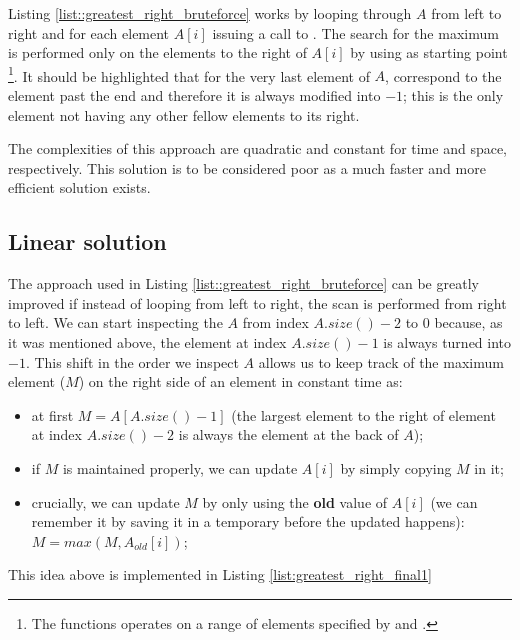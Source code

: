 

Listing \ref{list::greatest_right_bruteforce} works by looping through $A$ from left to right and for each element $A[i]$ issuing a call to . The search for the maximum is performed only on the elements to the right of $A[i]$ by using as starting point \footnote{The  functions operates on a range of elements specified by  and  \cite{cit::std::maxelement}.}.
It should be highlighted that for the very last element of $A$,  correspond to the element past the end and therefore it is always modified into $-1$; this is the only element not having any other fellow elements to its right.

The complexities of this approach are quadratic and constant for time and space, respectively. 
This solution is to be considered poor as a much faster and more efficient solution exists.

\subsection{Linear solution}
\label{sec:greatest_right:linear}
The approach used in Listing \ref{list::greatest_right_bruteforce} can be greatly improved if instead of looping from left to right, the scan is performed from right to left.
We can start inspecting the $A$ from index $A.size()-2$ to $0$ because, as it was mentioned above, the  element at index $A.size()-1$ is always turned into $-1$. 
This shift in the order we inspect $A$ allows us to keep track of the maximum element ($M$) on the right side of an element in constant time as:
\begin{itemize}
	\item at first $M=A[A.size()-1]$ (the largest element to the right of element at index $A.size()-2$ is always the element at the back of $A$);
	\item if $M$ is maintained properly, we can update $A[i]$ by simply copying $M$ in it;
	\item crucially, we can update $M$ by only using the \textbf{old} value of $A[i]$ (we can remember it by saving it in a temporary before the updated happens): $M= max(M, A_{old}[i])$;
\end{itemize}
This idea above is implemented in Listing \ref{list:greatest_right_final1}

